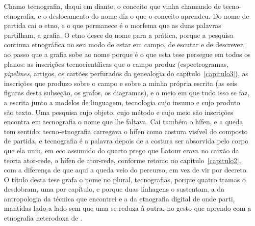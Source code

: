 Chamo tecnografia, daqui em diante, o conceito que vinha chamando de tecno-etnografia, e o deslocamento do nome diz o que o conceito aprendeu. Do nome de partida cai o etno, e o que permanece é o morfema que as duas palavras partilham, a grafia. O etno desce do nome para a prática, porque a pesquisa continua etnográfica no seu modo de estar em campo, de escutar e de descrever, ao passo que a grafia sobe ao nome porque é o que esta tese persegue em todos os planos: as inscrições tecnocientíficas que o campo produz (espectrogramas, \emph{pipelines}, artigos, os cartões perfurados da genealogia do capítulo~\ref{capitulo3}), as inscrições que produzo sobre o campo e sobre a minha própria escrita (as seis figuras desta subseção, os grafos, os diagramas), e o meio em que tudo isso se faz, a escrita junto a modelos de linguagem, tecnologia cujo insumo e cujo produto são texto. Uma pesquisa cujo objeto, cujo método e cujo meio são inscrições encontra em tecnografia o nome que lhe faltava. Cai também o hífen, e a queda tem sentido: tecno-etnografia carregava o hífen como costura visível do composto de partida, e tecnografia é a palavra depois de a costura ser absorvida pelo corpo que ela uniu, em eco assumido do quarto prego que Latour crava no caixão da teoria ator-rede, o hífen de ator-rede, conforme retomo no capítulo~\ref{capitulo2}, com a diferença de que aqui a queda veio do percurso, em vez de vir por decreto. O título desta tese grafa o nome no plural, tecnografias, porque quatro tramas o desdobram, uma por capítulo, e porque duas linhagens o sustentam, a da antropologia da técnica que encontrei e a da etnografia digital de onde parti, mantidas lado a lado sem que uma se reduza à outra, no gesto que aprendo com a etnografia heterodoxa de \textcite{Kofes2015Maconaria}.



